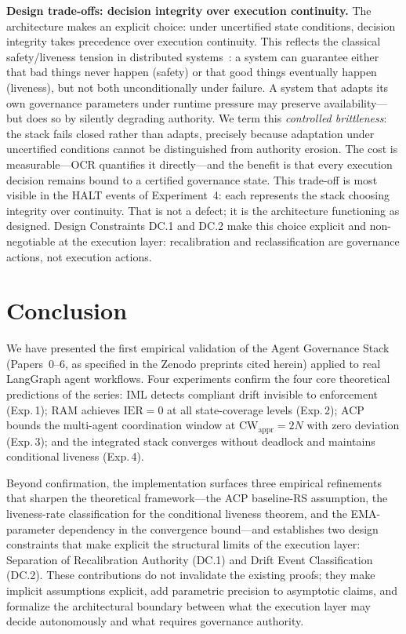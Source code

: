 \documentclass[11pt]{article}
\newcommand{\CW}{\mathrm{CW}}
\newcommand{\IER}{\mathrm{IER}}
\begin{document}
\textbf{Design trade-offs: decision integrity over execution continuity.}
The architecture makes an explicit choice: under uncertified state
conditions, decision integrity takes precedence over execution continuity.
This reflects the classical safety/liveness tension in distributed
systems~\cite{lamport2001paxos,alpern1985defining}: a system can guarantee
either that bad things never happen (safety) or that good things eventually
happen (liveness), but not both unconditionally under failure.
A system that adapts its own governance parameters under runtime pressure
may preserve availability---but does so by silently degrading authority.
We term this \emph{controlled brittleness}: the stack fails closed rather
than adapts, precisely because adaptation under uncertified conditions
cannot be distinguished from authority erosion.
The cost is measurable---OCR quantifies it directly---and the benefit is
that every execution decision remains bound to a certified governance state.
This trade-off is most visible in the HALT events of Experiment~4: each
represents the stack choosing integrity over continuity. That is not a
defect; it is the architecture functioning as designed.
Design Constraints DC.1 and DC.2 make this choice explicit and
non-negotiable at the execution layer: recalibration and reclassification
are governance actions, not execution actions.

\section{Conclusion}
\label{sec:conclusion}

We have presented the first empirical validation of the Agent Governance
Stack (Papers~0--6, as specified in the Zenodo preprints cited herein)
applied to real LangGraph agent workflows.
Four experiments confirm the four core theoretical predictions of the series:
IML detects compliant drift invisible to enforcement (Exp.\,1);
RAM achieves $\IER=0$ at all state-coverage levels (Exp.\,2);
ACP bounds the multi-agent coordination window at $\CW_{\mathrm{appr}} = 2N$
with zero deviation (Exp.\,3);
and the integrated stack converges without deadlock and maintains
conditional liveness (Exp.\,4).

Beyond confirmation, the implementation surfaces three empirical refinements
that sharpen the theoretical framework---the ACP baseline-RS assumption,
the liveness-rate classification for the conditional liveness theorem, and
the EMA-parameter dependency in the convergence bound---and establishes
two design constraints that make explicit the structural limits of the
execution layer: Separation of Recalibration Authority (DC.1) and
Drift Event Classification (DC.2).
These contributions do not invalidate the existing proofs; they make
implicit assumptions explicit, add parametric precision to asymptotic
claims, and formalize the architectural boundary between what the
execution layer may decide autonomously and what requires governance
authority.
\end{document}
